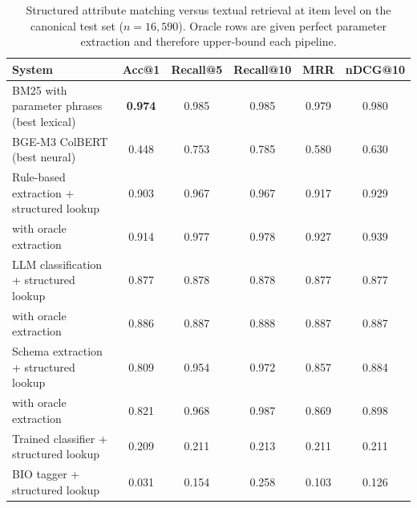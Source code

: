 \begin{table}[ht]
\centering
\caption{Structured attribute matching versus textual retrieval at item level on the canonical test set ($n=16{,}590$). Oracle rows are given perfect parameter extraction and therefore upper-bound each pipeline.}
\label{tab:structured_baselines}
\begin{tabular}{lccccc}
\toprule
\textbf{System} & \textbf{Acc@1} & \textbf{Recall@5} & \textbf{Recall@10} & \textbf{MRR} & \textbf{nDCG@10} \\
\midrule
BM25 with parameter phrases (best lexical) & \textbf{0.974} & 0.985 & 0.985 & 0.979 & 0.980 \\
BGE-M3 ColBERT (best neural) & 0.448 & 0.753 & 0.785 & 0.580 & 0.630 \\
Rule-based extraction + structured lookup & 0.903 & 0.967 & 0.967 & 0.917 & 0.929 \\
\quad with oracle extraction & 0.914 & 0.977 & 0.978 & 0.927 & 0.939 \\
LLM classification + structured lookup & 0.877 & 0.878 & 0.878 & 0.877 & 0.877 \\
\quad with oracle extraction & 0.886 & 0.887 & 0.888 & 0.887 & 0.887 \\
Schema extraction + structured lookup & 0.809 & 0.954 & 0.972 & 0.857 & 0.884 \\
\quad with oracle extraction & 0.821 & 0.968 & 0.987 & 0.869 & 0.898 \\
Trained classifier + structured lookup & 0.209 & 0.211 & 0.213 & 0.211 & 0.211 \\
BIO tagger + structured lookup & 0.031 & 0.154 & 0.258 & 0.103 & 0.126 \\
\bottomrule
\end{tabular}
\end{table}

